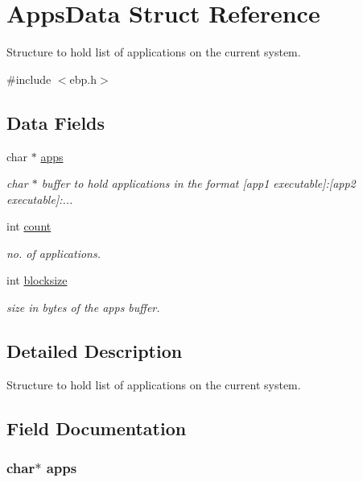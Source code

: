 \hypertarget{struct_apps_data}{\section{\-Apps\-Data \-Struct \-Reference}
\label{struct_apps_data}
}


\-Structure to hold list of applications on the current system.  




{\ttfamily \#include $<$ebp.\-h$>$}

\subsection*{\-Data \-Fields}
\begin{DoxyCompactItemize}
\item 
char $\ast$ \hyperlink{struct_apps_data_a9dcf3b30e014b23c118f50fd05ce1b4b}{apps}
\begin{DoxyCompactList}\small\item\em char $\ast$ buffer to hold applications in the format \mbox{[}app1 executable\mbox{]}\-:\mbox{[}app2 executable\mbox{]}\-:... \end{DoxyCompactList}\item 
int \hyperlink{struct_apps_data_ad43c3812e6d13e0518d9f8b8f463ffcf}{count}
\begin{DoxyCompactList}\small\item\em no. of applications. \end{DoxyCompactList}\item 
int \hyperlink{struct_apps_data_a75e9073defcedf91712de41e4ac14800}{blocksize}
\begin{DoxyCompactList}\small\item\em size in bytes of the apps buffer. \end{DoxyCompactList}\end{DoxyCompactItemize}


\subsection{\-Detailed \-Description}
\-Structure to hold list of applications on the current system. 

\subsection{\-Field \-Documentation}
\hypertarget{struct_apps_data_a9dcf3b30e014b23c118f50fd05ce1b4b}{
\subsubsection[{apps}]{\setlength{\rightskip}{0pt plus 5cm}char$\ast$ {\bf apps}}}\label{struct_apps_data_a9dcf3b30e014b23c118f50fd05ce1b4b}


